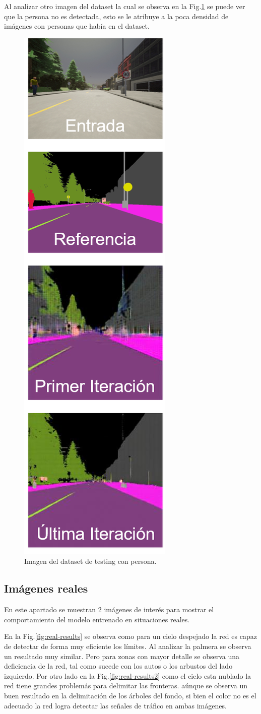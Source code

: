 \documentclass[]{IEEEtran}
\begin{document}
    Al analizar otro imagen del dataset la cual se observa en la Fig.\ref{fig:person_image}
    se puede ver que la persona no es detectada, esto se le atribuye a la poca densidad de imágenes con personas 
    que había en el dataset.

    \begin{figure}
        \centering
        \includegraphics[width=.25\textwidth]{Imgs/results-2.png}
        \caption{Imagen del dataset de testing con persona.}
        \label{fig:person_image}
    \end{figure}

    \subsection{Imágenes reales}

    En este apartado se muestran 2 imágenes de interés para mostrar el comportamiento del modelo entrenado en situaciones reales.

    En la Fig.\ref{fig:real-results} se observa como para un cielo despejado la red es capaz de detectar de forma muy eficiente los límites. 
    Al analizar la palmera se observa un resultado muy similar. Pero para zonas con mayor detalle se observa una deficiencia de la red, tal 
    como sucede con los autos o los arbustos del lado izquierdo. Por otro lado en la Fig.\ref{fig:real-results2} como el cielo esta nublado 
    la red tiene grandes problemás para delimitar las fronteras. aúnque se observa un buen resultado en la delimitación de los árboles del fondo, 
    si bien el color no es el adecuado la red logra detectar las señales de tráfico en ambas imágenes.
\end{document}
